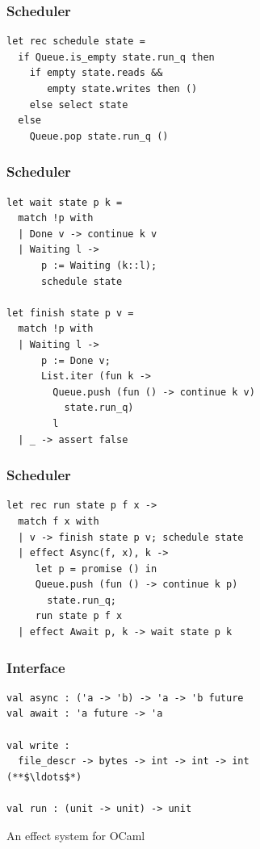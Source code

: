 \documentclass{beamer}
\begin{document}
\begin{frame}[fragile]
\frametitle{Scheduler}
\begin{lstlisting}[style=ocaml]
let rec schedule state =
  if Queue.is_empty state.run_q then
    if empty state.reads &&
       empty state.writes then ()
    else select state
  else
    Queue.pop state.run_q ()
\end{lstlisting}
\end{frame}

\begin{frame}[fragile]
\frametitle{Scheduler}
\begin{lstlisting}[style=ocaml]
let wait state p k =
  match !p with
  | Done v -> continue k v
  | Waiting l ->
      p := Waiting (k::l);
      schedule state

let finish state p v =
  match !p with
  | Waiting l ->
      p := Done v;
      List.iter (fun k ->
        Queue.push (fun () -> continue k v)
          state.run_q)
        l
  | _ -> assert false
\end{lstlisting}
\end{frame}

\begin{frame}[fragile]
\frametitle{Scheduler}
\begin{lstlisting}[style=ocaml]
let rec run state p f x ->
  match f x with
  | v -> finish state p v; schedule state
  | effect Async(f, x), k ->
     let p = promise () in
     Queue.push (fun () -> continue k p)
       state.run_q;
     run state p f x
  | effect Await p, k -> wait state p k
\end{lstlisting}
\end{frame}

\begin{frame}[fragile]
\frametitle{Interface}
\begin{lstlisting}[style=ocaml]
val async : ('a -> 'b) -> 'a -> 'b future
val await : 'a future -> 'a

val write :
  file_descr -> bytes -> int -> int -> int
(**$\ldots$*)

val run : (unit -> unit) -> unit
\end{lstlisting}
\end{frame}

\begin{frame}[c]
\begin{center}
\Huge An effect system for OCaml
\end{center}
\end{frame}
\end{document}
